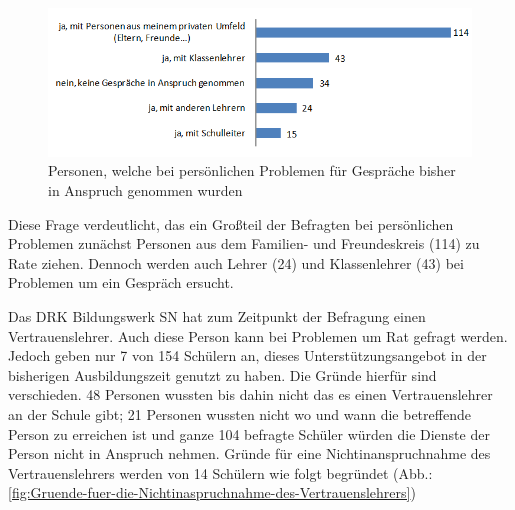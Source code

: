 \begin{figure}[ht]
	\centering
		\includegraphics[width=1.0\textwidth]{images/welche-Personen-wurden-bisher-bei-persoenlichen-Problemen-in-der-zurueckliegenden-Ausbildungszeit-fuer-Gespraeche-in-Anspruch-genommen.png}
	\caption{Personen, welche bei persönlichen Problemen für Gespräche bisher in Anspruch genommen wurden}
	\label{fig:welche-Personen-wurden-bisher bei-persoenlichen-Problemen-in-der-zurueckliegenden-Ausbildungszeit-fuer-Gespraeche-in-Anspruch-genommen}
\end{figure}

\noindent
Diese Frage verdeutlicht, das ein Großteil der Befragten bei persönlichen Problemen zunächst Personen aus dem Familien- und Freundeskreis (114) zu Rate ziehen. Dennoch werden auch Lehrer (24) und Klassenlehrer (43) bei Problemen um ein Gespräch ersucht.

Das DRK Bildungswerk SN hat zum Zeitpunkt der Befragung einen Vertrauenslehrer. Auch diese Person kann bei Problemen um Rat gefragt werden. Jedoch geben nur 7 von 154 Schülern an, dieses Unterstützungsangebot in der bisherigen Ausbildungszeit genutzt zu haben. Die Gründe hierfür sind verschieden. 48 Personen wussten bis dahin nicht das es einen Vertrauenslehrer an der Schule gibt; 21 Personen wussten nicht wo und wann die betreffende Person zu erreichen ist und ganze 104 befragte Schüler würden die Dienste der Person nicht in Anspruch nehmen. Gründe für eine Nichtinanspruchnahme des Vertrauenslehrers werden von 14 Schülern wie folgt begründet (Abb.: \ref{fig:Gruende-fuer-die-Nichtinaspruchnahme-des-Vertrauenslehrers})

